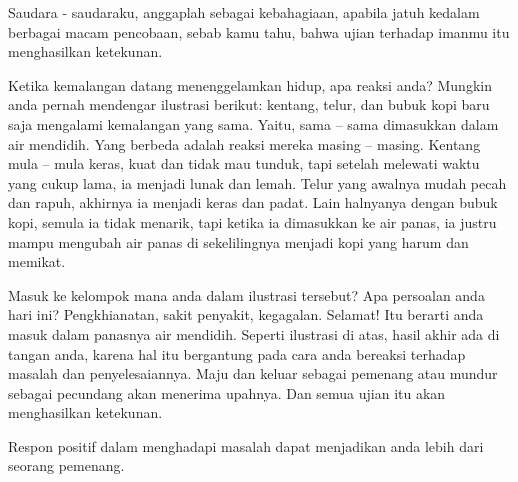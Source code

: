 
Saudara - saudaraku, anggaplah sebagai kebahagiaan, apabila jatuh kedalam berbagai macam pencobaan, sebab kamu tahu, bahwa ujian terhadap imanmu itu menghasilkan ketekunan.

Ketika kemalangan datang menenggelamkan hidup, apa reaksi anda? Mungkin anda pernah mendengar ilustrasi berikut: kentang, telur, dan bubuk kopi baru saja mengalami kemalangan yang sama. Yaitu, sama – sama dimasukkan dalam air mendidih. Yang berbeda adalah reaksi mereka masing – masing. Kentang mula – mula keras, kuat dan tidak mau tunduk, tapi setelah melewati waktu yang cukup lama, ia menjadi lunak dan lemah. Telur yang awalnya mudah pecah dan rapuh, akhirnya ia menjadi keras dan padat. Lain halnyanya dengan bubuk kopi, semula ia tidak menarik, tapi ketika ia dimasukkan ke air panas, ia justru mampu mengubah air panas di sekelilingnya menjadi kopi yang harum dan memikat.

Masuk ke kelompok mana anda dalam ilustrasi tersebut? Apa persoalan anda hari ini? Pengkhianatan, sakit penyakit, kegagalan. Selamat! Itu berarti anda masuk dalam panasnya air mendidih. Seperti ilustrasi di atas, hasil akhir ada di tangan anda, karena hal itu bergantung pada cara anda bereaksi terhadap masalah dan penyelesaiannya. Maju dan keluar sebagai pemenang atau mundur sebagai pecundang akan menerima upahnya. Dan semua ujian itu akan menghasilkan ketekunan.

Respon positif dalam menghadapi masalah dapat menjadikan anda lebih dari seorang pemenang.

